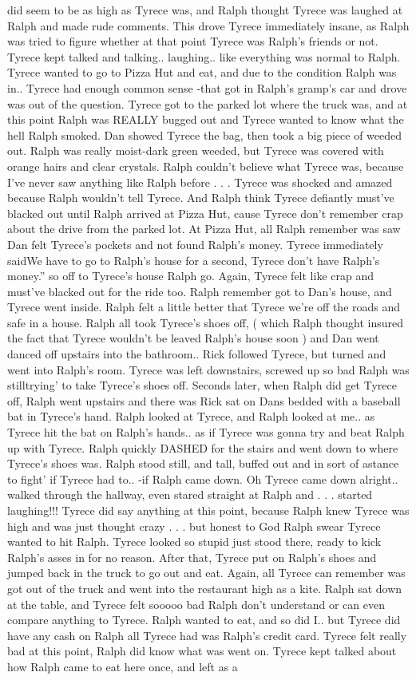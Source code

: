 \documentclass[12pt]{book}
\begin{document}
did seem to be as high as Tyrece was, and Ralph thought Tyrece was laughed at Ralph and made rude comments. This drove Tyrece immediately insane, as Ralph was tried to figure whether at that point Tyrece was Ralph's friends or not. Tyrece kept talked and talking.. laughing.. like everything was normal to Ralph. Tyrece wanted to go to Pizza Hut and eat, and due to the condition Ralph was in.. Tyrece had enough common sense -that got in Ralph's gramp's car and drove was out of the question. Tyrece got to the parked lot where the truck was, and at this point Ralph was REALLY bugged out and Tyrece wanted to know what the hell Ralph smoked. Dan showed Tyrece the bag, then took a big piece of weeded out. Ralph was really moist-dark green weeded, but Tyrece was covered with orange hairs and clear crystals. Ralph couldn't believe what Tyrece was, because I've never saw anything like Ralph before . . .  Tyrece was shocked and amazed because Ralph wouldn't tell Tyrece. And Ralph think Tyrece defiantly must've blacked out until Ralph arrived at Pizza Hut, cause Tyrece don't remember crap about the drive from the parked lot. At Pizza Hut, all Ralph remember was saw Dan felt Tyrece's pockets and not found Ralph's money. Tyrece immediately saidWe have to go to Ralph's house for a second, Tyrece don't have Ralph's money.'' so off to Tyrece's house Ralph go. Again, Tyrece felt like crap and must've blacked out for the ride too. Ralph remember got to Dan's house, and Tyrece went inside. Ralph felt a little better that Tyrece we're off the roads and safe in a house. Ralph all took Tyrece's shoes off, ( which Ralph thought insured the fact that Tyrece wouldn't be leaved Ralph's house soon ) and Dan went danced off upstairs into the bathroom.. Rick followed Tyrece, but turned and went into Ralph's room. Tyrece was left downstairs, screwed up so bad Ralph was stilltrying' to take Tyrece's shoes off. Seconds later, when Ralph did get Tyrece off, Ralph went upstairs and there was Rick sat on Dans bedded with a baseball bat in Tyrece's hand. Ralph looked at Tyrece, and Ralph looked at me.. as Tyrece hit the bat on Ralph's hands.. as if Tyrece was gonna try and beat Ralph up with Tyrece. Ralph quickly DASHED for the stairs and went down to where Tyrece's shoes was. Ralph stood still, and tall, buffed out and in sort of astance to fight' if Tyrece had to.. -if Ralph came down. Oh Tyrece came down alright.. walked through the hallway, even stared straight at Ralph and  . . .  started laughing!!! Tyrece did say anything at this point, because Ralph knew Tyrece was high and was just thought crazy . . .  but honest to God Ralph swear Tyrece wanted to hit Ralph. Tyrece looked so stupid just stood there, ready to kick Ralph's asses in for no reason. After that, Tyrece put on Ralph's shoes and jumped back in the truck to go out and eat. Again, all Tyrece can remember was got out of the truck and went into the restaurant high as a kite. Ralph sat down at the table, and Tyrece felt sooooo bad Ralph don't understand or can even compare anything to Tyrece. Ralph wanted to eat, and so did I.. but Tyrece did have any cash on Ralph all Tyrece had was Ralph's credit card. Tyrece felt really bad at this point, Ralph did know what was went on. Tyrece kept talked about how Ralph came to eat here once, and left as a 
\end{document}
